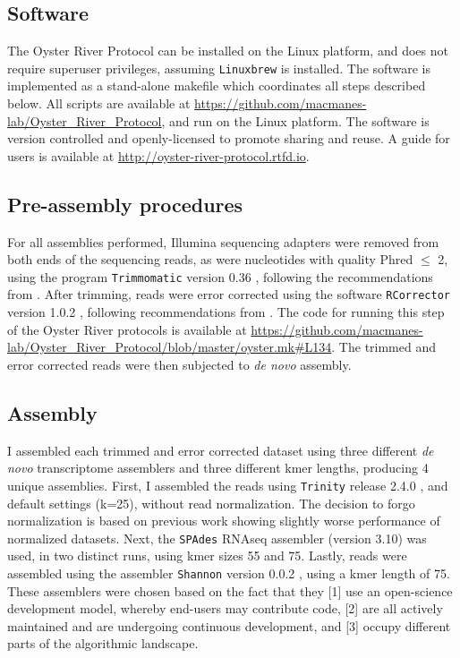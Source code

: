 \documentclass[10pt,letterpaper]{article}
\begin{document}
\subsection{Software}

The Oyster River Protocol can be installed on the Linux platform, and does not require superuser privileges, assuming \texttt{Linuxbrew} \citep{Jackman:2016bx} is installed. The software is implemented as a stand-alone makefile which coordinates all steps described below. All scripts are available at \url{https://github.com/macmanes-lab/Oyster_River_Protocol}, and run on the Linux platform. The software is version controlled and openly-licensed to promote sharing and reuse. A guide for users is available at \url{http://oyster-river-protocol.rtfd.io}. 


\subsection{Pre-assembly procedures}

For all assemblies performed, Illumina sequencing adapters were removed from both ends of the sequencing reads, as were nucleotides with quality Phred $\leq$ 2, using the program \texttt{Trimmomatic} version 0.36 \cite{Bolger:2014ek}, following the recommendations from \cite{MacManes:2014io}. After trimming, reads were error corrected using the software \texttt{RCorrector} version 1.0.2 \cite{Song:2015in}, following recommendations from \cite{MacManes:2013ec}. The code for running this step of the Oyster River protocols is available at \url{https://github.com/macmanes-lab/Oyster_River_Protocol/blob/master/oyster.mk#L134}. The trimmed and error corrected reads were then subjected to \textit{de novo} assembly. 


\subsection{Assembly}

I assembled each trimmed and error corrected dataset using three different \textit{de novo} transcriptome assemblers and three different kmer lengths, producing 4 unique assemblies. First, I assembled the reads using \texttt{Trinity} release 2.4.0 \citep{Haas:2013jq}, and default settings (k=25), without read normalization. The decision to forgo normalization is based on previous work \citep{MacManes:2015iz} showing slightly worse performance of normalized datasets. Next, the \texttt{SPAdes} RNAseq assembler (version 3.10) \cite{Chikhi:2013ep} was used, in two distinct runs, using kmer sizes 55 and 75. Lastly, reads were assembled using the assembler \texttt{Shannon} version 0.0.2 \cite{Kannan:2016be}, using a kmer length of 75. These assemblers were chosen based on the fact that they [1] use an open-science development model, whereby end-users may contribute code, [2] are all actively maintained and are undergoing continuous development, and [3] occupy different parts of the algorithmic landscape. 
\end{document}
